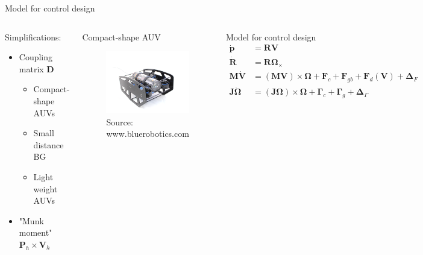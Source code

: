 \documentclass{beamer}
\begin{document}
\begin{frame}{Model for control design}
\begin{columns}
	\begin{block}{Simplifications:}
		\begin{itemize}
			\scriptsize
			\item Coupling matrix $\mathbf{D}$
			\begin{itemize}
				\scriptsize
				\item Compact-shape AUVs
				\item Small distance BG
				\item Light weight AUVs
			\end{itemize}
			\item "Munk moment" $\mathbf{P}_h \!\times \!\mathbf{V}_h$
		\end{itemize}		
	\end{block}
	\begin{block}{Compact-shape AUV}
		\begin{figure}
			\includegraphics[width = 1.0\textwidth]{Images/Bluerov.png}\\
			\tiny Source: www.bluerobotics.com
		\end{figure}
	\end{block}
	\begin{block}{Model for control design}
		\scriptsize
		\[
		\begin{array}{rl}
		\dot{\mathbf{p}} & =  \mathbf{R} \mathbf{V} \label{eq:kinematicsPos}\\
		\dot{\mathbf{R}} & =  \mathbf{R} \mathbf{\Omega}_\times \\
		\mathbf{M}\dot{\mathbf{V}} &= (\mathbf{M}\mathbf{V}) \!\times\!\mathbf{\Omega} + \mathbf{F}_c + \mathbf{F}_{gb} + \mathbf{F}_d(\mathbf{V}) +\mathbf{\Delta}_F  \\
		\mathbf{J}\dot{\mathbf{\Omega}} &=  (\mathbf{J}\mathbf{\Omega}) \!\times\! \mathbf{\mathbf{\Omega}} + \mathbf{\Gamma}_c + \mathbf{\Gamma}_g +  \mathbf{\Delta}_{\Gamma}
		\end{array} 
		\]
		

\end{block}
\end{columns}
\end{frame}
\end{document}
